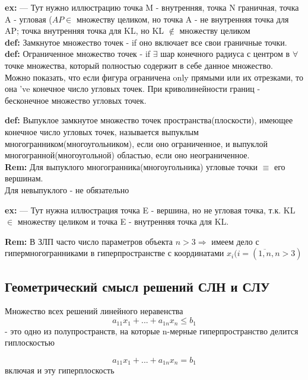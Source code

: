 \textbf{ex:}
--- Тут нужно иллюстрацию
точка M - внутренняя, точка N граничная, точка A - угловая ($AP \in$ множеству целиком, но точка A - не внутренняя точка для AP; точка внутренняя точка для KL, но KL $\notin$ множеству целиком \\

\textbf{def:} Замкнутое множество точек - if оно включает все свои граничные точки. \\

\textbf{def:} Ограниченное множество точек - if $\exists$ шар конечного радиуса с центром в $\forall$ точке множества, который полностью содержит в себе данное множество.  \\

Можно показать, что если фигура ограничена only прямыми или их отрезками, то она 've конечное число угловых точек. При криволинейности границ - бесконечное множество угловых точек.

\textbf{def:} Выпуклое замкнутое множество точек пространства(плоскости), имеющее конечное число угловых точек, называется выпуклым многогранником(многоугольником), если оно ограниченное, и выпуклой многогранной(многоугольной) областью, если оно неограниченное. \\



\textbf{Rem:} Для выпуклого многогранника(многоугольника) угловые точки $\equiv$ его вершинам. \\
Для невыпуклого - не обязательно

\textbf{ex:} --- Тут нужна иллюстрация точка E - вершина, но не угловая точка, т.к. KL $\in$ множеству целиком и точка E - внутренняя точка для KL.

\textbf{Rem:} В ЗЛП часто число параметров объекта $n > 3 \Rightarrow$ имеем дело с гипермногогранниками в гиперпространстве с координатами $x_i (i = (\overline{1,n}, n > 3)$

\subsection*{Геометрический смысл решений СЛН и СЛУ}

\begin{theorem}
Множество всех решений линейного неравенства 
    \begin{equation*}
    a_{11} x_1 + ... + a_{1n}x_n \leq b_1
    \end{equation*} - это одно из полупространств, на которые n-мерные гиперпространство делится гиплоскостью
    
    \begin{equation*}
    a_{11} x_1 + ... + a_{1n}x_n = b_1
    \end{equation*} включая и эту гиперплоскость   
\end{theorem}

